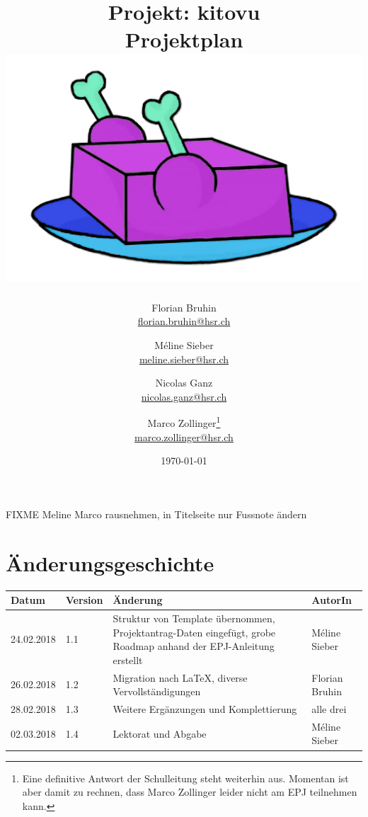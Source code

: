 \documentclass[a4paper]{article}
\let\oldsection\section
\renewcommand\section{\clearpage\oldsection}
\begin{document}
\title{
  Projekt: kitovu \\
  \Large{Projektplan} \\[3em]
  \includegraphics[width=20em]{../../img/logo/kitovu.jpg}
}
\author{
  Florian Bruhin \\ \url{florian.bruhin@hsr.ch} \and
  Méline Sieber \\ \url{meline.sieber@hsr.ch} \and
  Nicolas Ganz \\ \url{nicolas.ganz@hsr.ch} \and
  Marco Zollinger\footnote{Eine definitive Antwort der Schulleitung steht
    weiterhin aus. Momentan ist aber damit zu rechnen, dass Marco Zollinger
    leider nicht am EPJ teilnehmen kann.} \\ \url{marco.zollinger@hsr.ch}}
\date{\today}

\maketitle

FIXME Meline Marco rausnehmen, in Titelseite nur Fussnote ändern

\section*{Änderungsgeschichte}

\begin{tabular}{ll>{\raggedright}p{20em}l}
\toprule
Datum & Version & Änderung & AutorIn \\
\midrule
24.02.2018 & 1.1 & Struktur von Template übernommen, Projektantrag-Daten eingefügt, grobe Roadmap anhand der EPJ-Anleitung erstellt & Méline Sieber \\
26.02.2018 & 1.2 & Migration nach \LaTeX{}, diverse Vervollständigungen & Florian Bruhin \\
28.02.2018 & 1.3 & Weitere Ergänzungen und Komplettierung & alle drei \\
02.03.2018 & 1.4 & Lektorat und Abgabe & Méline Sieber \\
\bottomrule
\end{tabular}
\pagebreak
\end{document}
